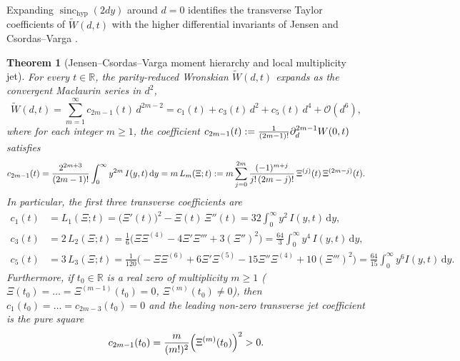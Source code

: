 \documentclass[11pt,a4paper,reqno]{amsart}
\newtheorem{theorem}{Theorem}[section]
\theoremstyle{definition}
\theoremstyle{remark}
\numberwithin{equation}{section}
\newcommand{\dd}{\mathrm{d}}
\newcommand{\Wtil}{\widetilde{W}}
\newcommand{\sinch}{\operatorname{sinc}_{\mathrm{hyp}}}
\newcommand{\fac}{\mathclose{\mathchar"0021}}
\begin{document}
Expanding $\sinch(2dy)$ around $d = 0$ identifies the transverse Taylor coefficients of $\Wtil(d,t)$ with the higher differential invariants of Jensen \cite{Jensen1913} and Csordas--Varga \cite{CsordasVarga1990}.

\begin{theorem}[Jensen--Csordas--Varga moment hierarchy and local multiplicity jet]\label{thm:dipole_hierarchy}
For every $t \in \mathbb{R}$, the parity-reduced Wronskian $\Wtil(d,t)$ expands as the convergent Maclaurin series in $d^2$,
\begin{equation}\label{eq:Wtil_taylor}
\Wtil(d,t) = \sum_{m=1}^\infty c_{2m-1}(t)\,d^{2m-2} = c_1(t) + c_3(t)\,d^2 + c_5(t)\,d^4 + \mathcal{O}(d^6),
\end{equation}
where for each integer $m \ge 1$, the coefficient $c_{2m-1}(t) := \frac{1}{(2m-1)\fac}\partial_d^{2m-1}W(0,t)$ satisfies
\begin{equation}\label{eq:c2m_general}
c_{2m-1}(t) = \frac{2^{2m+3}}{(2m-1)\fac}\int_0^\infty y^{2m}\,I(y,t)\,\dd y = m\,L_m(\Xi;t) := m\sum_{j=0}^{2m} \frac{(-1)^{m+j}}{j\fac\,(2m-j)\fac}\,\Xi^{(j)}(t)\,\Xi^{(2m-j)}(t).
\end{equation}
In particular, the first three transverse coefficients are
\begin{align}
c_1(t) &= L_1(\Xi;t) = \big(\Xi'(t)\big)^2 - \Xi(t)\,\Xi''(t) = 32\int_0^\infty y^2\,I(y,t)\,\dd y, \label{eq:c1_explicit} \\
c_3(t) &= 2\,L_2(\Xi;t) = \frac{1}{6}\big(\Xi\Xi^{(4)} - 4\Xi'\Xi''' + 3(\Xi'')^2\big) = \frac{64}{3}\int_0^\infty y^4\,I(y,t)\,\dd y, \label{eq:c3_explicit} \\
c_5(t) &= 3\,L_3(\Xi;t) = \frac{1}{120}\big(-\Xi\Xi^{(6)} + 6\Xi'\Xi^{(5)} - 15\Xi''\Xi^{(4)} + 10(\Xi''')^2\big) = \frac{64}{15}\int_0^\infty y^6 I(y,t)\,\dd y. \label{eq:c5_explicit}
\end{align}
Furthermore, if $t_0 \in \mathbb{R}$ is a real zero of multiplicity $m \ge 1$ ($\Xi(t_0) = \dots = \Xi^{(m-1)}(t_0) = 0$, $\Xi^{(m)}(t_0) \neq 0$), then $c_1(t_0) = \dots = c_{2m-3}(t_0) = 0$ and the leading non-zero transverse jet coefficient is the pure square
\begin{equation}\label{eq:square_cascade}
c_{2m-1}(t_0) = \frac{m}{(m\fac)^2}\Big(\Xi^{(m)}(t_0)\Big)^2 > 0.
\end{equation}
\end{theorem}
\end{document}
